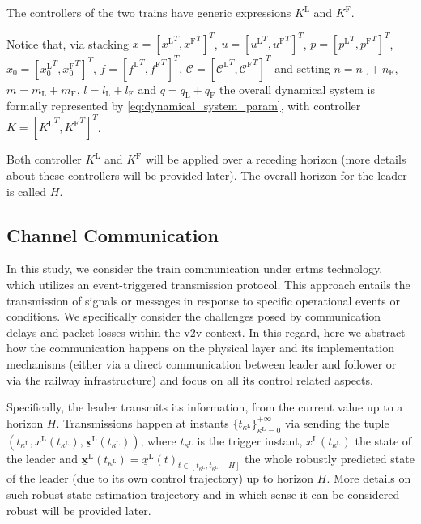 The controllers of the two trains have generic expressions $K^\mathrm{L}$ and $K^\mathrm{F}$.


Notice that, via stacking $x=[{x^\mathrm{L}}^T, {x^\mathrm{F}}^T]^T$, $u=[{u^\mathrm{L}}^T, {u^\mathrm{F}}^T]^T$, $p=[{p^\mathrm{L}}^T, {p^\mathrm{F}}^T]^T$, $x_0=[{x_0^\mathrm{L}}^T, {x_0^\mathrm{F}}^T]^T$, $f=[{f^\mathrm{L}}^T, {f^\mathrm{F}}^T]^T$, $\mathcal{C}=[{\mathcal{C^\mathrm{L}}}^T, {\mathcal{C^\mathrm{F}}}^T]^T$ and setting $n=n_\mathrm{L}+n_\mathrm{F}$, $m=m_\mathrm{L}+m_\mathrm{F}$, $l=l_\mathrm{L}+l_\mathrm{F}$ and $q=q_\mathrm{L}+q_\mathrm{F}$ the overall dynamical system is formally represented by \eqref{eq:dynamical_system_param}, with controller $K=[{K^\mathrm{L}}^T, {K^\mathrm{F}}^T]^T$. 

Both controller $K^\mathrm{L}$ and $K^\mathrm{F}$ will be applied over a receding horizon (more details about these controllers will be provided later). The overall horizon for the leader is called $H$.



%
\subsection{Channel Communication}
\label{subsec:transmissionEvent}
%
%


In this study, we consider the train communication under \gls{ertms} technology, which  utilizes an event-triggered transmission protocol. This approach entails the transmission of signals or messages in response to specific operational events or conditions. We specifically consider the challenges posed by communication delays and packet losses within the \gls{v2v} context.
In this regard, here we abstract how the communication happens on the physical layer and its implementation mechanisms (either via a direct communication between leader and follower or via the railway infrastructure) and focus on all its control related aspects.


Specifically, the leader transmits its information, from the current value up to a horizon \(H\). Transmissions happen at instants \(\{ t_{\kappa^\mathrm{L}} \}_{\kappa^\mathrm{L}=0}^{+\infty}\) via sending the tuple $\left ( t_{\kappa^\mathrm{L}}, x^\mathrm{L}(t_{\kappa^\mathrm{L}}),\underline{\mathbf{x}}^\mathrm{L}(t_{\kappa^\mathrm{L}})\right)$, where $t_{\kappa^\mathrm{L}}$ is the trigger instant, $x^\mathrm{L}(t_{\kappa^\mathrm{L}})$ the state of the leader and 
$\underline{\mathbf{x}}^\mathrm{L}(t_{\kappa^\mathrm{L}})=\underline{x}^\mathrm{L}(t)_{t\in [t_{\kappa^\mathrm{L}}, t_{\kappa^\mathrm{L}} + H]}$ the whole robustly predicted state of the leader (due to its own control trajectory) up to horizon $H$.
More details on  such robust state estimation trajectory and in which sense it can be considered robust will be provided later. 

